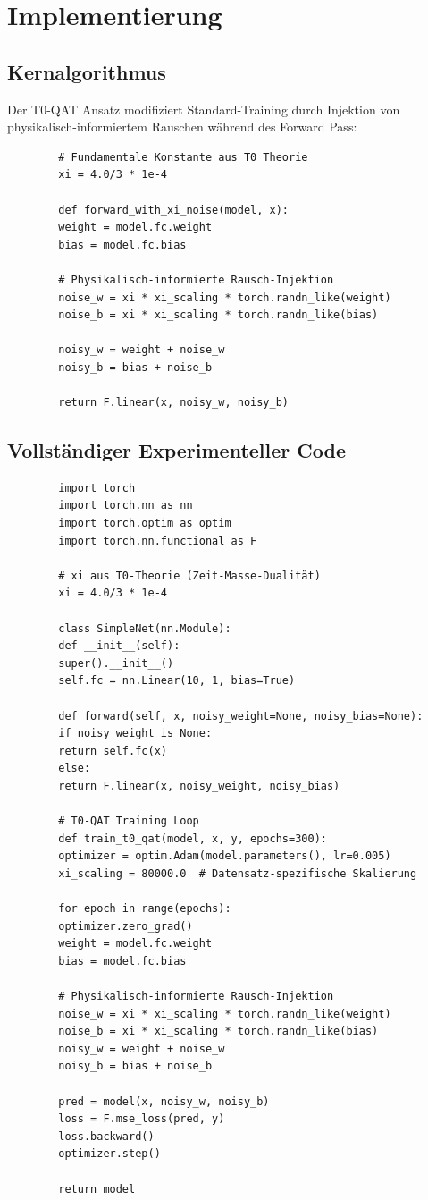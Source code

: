 	\section{Implementierung}
	
	\subsection{Kernalgorithmus}
	
	Der T0-QAT Ansatz modifiziert Standard-Training durch Injektion von physikalisch-informiertem Rauschen während des Forward Pass:
	
	\begin{verbatim}
		# Fundamentale Konstante aus T0 Theorie
		xi = 4.0/3 * 1e-4
		
		def forward_with_xi_noise(model, x):
		weight = model.fc.weight
		bias = model.fc.bias
		
		# Physikalisch-informierte Rausch-Injektion
		noise_w = xi * xi_scaling * torch.randn_like(weight)
		noise_b = xi * xi_scaling * torch.randn_like(bias)
		
		noisy_w = weight + noise_w
		noisy_b = bias + noise_b
		
		return F.linear(x, noisy_w, noisy_b)
	\end{verbatim}
	
	\subsection{Vollständiger Experimenteller Code}
	
	\begin{verbatim}
		import torch
		import torch.nn as nn
		import torch.optim as optim
		import torch.nn.functional as F
		
		# xi aus T0-Theorie (Zeit-Masse-Dualität)
		xi = 4.0/3 * 1e-4
		
		class SimpleNet(nn.Module):
		def __init__(self):
		super().__init__()
		self.fc = nn.Linear(10, 1, bias=True)
		
		def forward(self, x, noisy_weight=None, noisy_bias=None):
		if noisy_weight is None:
		return self.fc(x)
		else:
		return F.linear(x, noisy_weight, noisy_bias)
		
		# T0-QAT Training Loop
		def train_t0_qat(model, x, y, epochs=300):
		optimizer = optim.Adam(model.parameters(), lr=0.005)
		xi_scaling = 80000.0  # Datensatz-spezifische Skalierung
		
		for epoch in range(epochs):
		optimizer.zero_grad()
		weight = model.fc.weight
		bias = model.fc.bias
		
		# Physikalisch-informierte Rausch-Injektion
		noise_w = xi * xi_scaling * torch.randn_like(weight)
		noise_b = xi * xi_scaling * torch.randn_like(bias)
		noisy_w = weight + noise_w
		noisy_b = bias + noise_b
		
		pred = model(x, noisy_w, noisy_b)
		loss = F.mse_loss(pred, y)
		loss.backward()
		optimizer.step()
		
		return model
	\end{verbatim}
	
